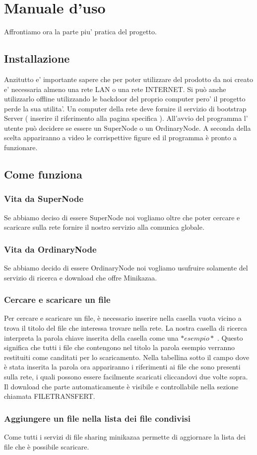 \chapter{Manuale d'uso}
Affrontiamo ora la parte piu' pratica del progetto.
\section{Installazione}
Anzitutto e' importante sapere che per poter utilizzare del prodotto da noi creato e' necessaria almeno una rete LAN o una rete INTERNET.
Si può anche utilizzarlo offline utilizzando le backdoor del proprio computer pero' il progetto perde la sua utilita'.
Un computer della rete deve fornire il servizio di bootstrap Server ( inserire il riferimento alla pagina specifica ).
All'avvio del programma l' utente può decidere se essere un SuperNode o un OrdinaryNode. 
A seconda della scelta appariranno a video le corrispettive figure ed il programma è pronto a funzionare.

\section{Come funziona}
	\subsection{Vita da SuperNode}
Se abbiamo deciso di essere SuperNode noi vogliamo oltre che poter cercare e scaricare sulla rete fornire il nostro servizio alla comunica globale.
	\subsection{Vita da OrdinaryNode}
Se abbiamo decido di essere OrdinaryNode noi vogliamo usufruire solamente del servizio di ricerca e download che offre Minikazaa.
	\subsection{Cercare e scaricare un file}
Per cercare e scaricare un file, è necessario inserire nella casella vuota vicino a trova il titolo del file che interessa trovare nella rete.
La nostra casella di ricerca interpreta la parola chiave inserita della casella come una $ *esempio* $ . Questo significa che tutti i file che contengono nel titolo la parola esempio verranno restituiti come canditati per lo scaricamento.
Nella tabellina sotto il campo dove è stata inserita la parola ora appariranno i riferimenti ai file che sono presenti sulla rete, i quali possono essere facilmente scaricati cliccandovi due volte sopra.
Il download che parte automaticamente è visibile e controllabile nella sezione chiamata FILETRANSFERT.

	\subsection{Aggiungere un file nella lista dei file condivisi}
Come tutti i servizi di file sharing minikazaa permette di aggiornare la lista dei file che è possibile scaricare.

	\subsection{}
